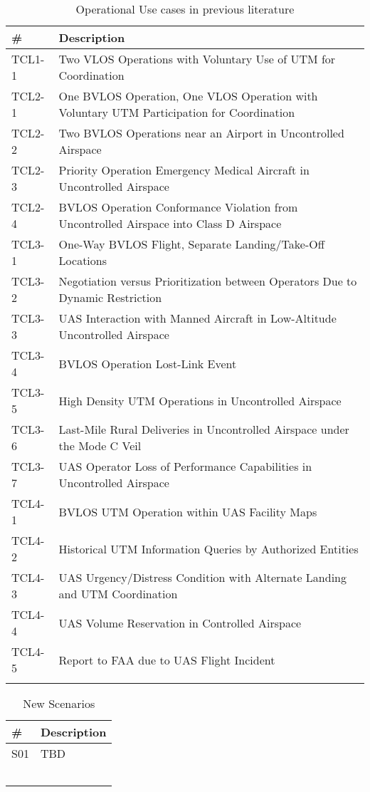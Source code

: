 \documentclass{ua_wgs_base}
\begin{document}
\begin{sidewaystable}
\small
\ttfamily
\begin{centering}
\begin{tabular}{|l|l|}
\hline 
\textbf{\#} & \textbf{Description}\tabularnewline
\hline 
\hline 
TCL1-1 & Two VLOS Operations with Voluntary Use of UTM for Coordination\tabularnewline
\hline 
TCL2-1 & One BVLOS Operation, One VLOS Operation with Voluntary UTM Participation
for Coordination\tabularnewline
\hline 
TCL2-2 & Two BVLOS Operations near an Airport in Uncontrolled Airspace\tabularnewline
\hline 
TCL2-3 & Priority Operation \textendash{} Emergency Medical Aircraft in Uncontrolled
Airspace\tabularnewline
\hline 
TCL2-4 & BVLOS Operation Conformance Violation from Uncontrolled Airspace into
Class D Airspace\tabularnewline
\hline 
TCL3-1 & One-Way BVLOS Flight, Separate Landing/Take-Off Locations\tabularnewline
\hline 
TCL3-2 & Negotiation versus Prioritization between Operators Due to Dynamic
Restriction\tabularnewline
\hline 
TCL3-3 & UAS Interaction with Manned Aircraft in Low-Altitude Uncontrolled
Airspace\tabularnewline
\hline 
TCL3-4 & BVLOS Operation Lost-Link Event\tabularnewline
\hline 
TCL3-5 & High Density UTM Operations in Uncontrolled Airspace\tabularnewline
\hline 
TCL3-6 & Last-Mile Rural Deliveries in Uncontrolled Airspace under the Mode
C Veil\tabularnewline
\hline 
TCL3-7 & UAS Operator Loss of Performance Capabilities in Uncontrolled Airspace\tabularnewline
\hline 
TCL4-1 & BVLOS UTM Operation within UAS Facility Maps\tabularnewline
\hline 
TCL4-2 & Historical UTM Information Queries by Authorized Entities\tabularnewline
\hline 
TCL4-3 & UAS Urgency/Distress Condition with Alternate Landing and UTM Coordination\tabularnewline
\hline 
TCL4-4 & UAS Volume Reservation in Controlled Airspace\tabularnewline
\hline 
TCL4-5 & Report to FAA due to UAS Flight Incident\tabularnewline
\hline 
 & \tabularnewline
\hline 
\end{tabular}
\par\end{centering}
\caption{Operational Use cases in previous literature\label{tab:Operational-Use-cases-old}}
\end{sidewaystable}

\begin{center}
\begin{table}[tbh]
\small
\ttfamily
\begin{centering}
\begin{tabular}{|l|l|}
\hline 
\textbf{\#} & \textbf{Description}\tabularnewline
\hline 
\hline 
S01 & TBD\tabularnewline
\hline 
 & \tabularnewline
\hline 
 & \tabularnewline
\hline 
 & \tabularnewline
\hline 
 & \tabularnewline
\hline 
 & \tabularnewline
\hline 
\end{tabular}
\par\end{centering}
\caption{New Scenarios\label{tab:new-scenarios}}
\end{table}
\par\end{center}
\end{document}
